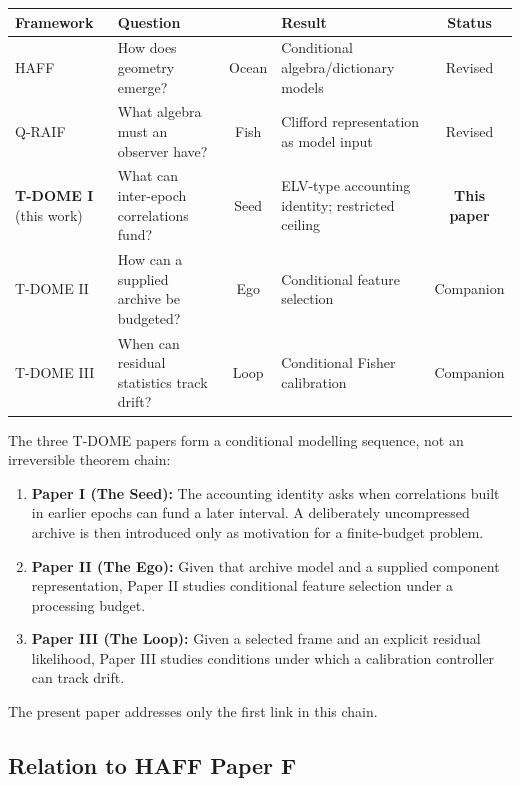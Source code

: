 \documentclass[12pt]{article}
\begin{document}
\begin{center}
\small
\setlength{\tabcolsep}{4pt}%
\begin{tabular}{@{}lP{3.2cm}cP{3.4cm}c@{}}
\toprule
\textbf{Framework} & \textbf{Question} & & \textbf{Result} & \textbf{Status} \\
\midrule
HAFF~\cite{Liu2026HAFF_A,Liu2026HAFF_B}
  & How does geometry emerge?
  & Ocean
  & Conditional algebra/dictionary models
  & Revised \\[3pt]
Q-RAIF~\cite{Liu2026QRAIF_A,Liu2026QRAIF_B}
  & What algebra must an observer have?
  & Fish
  & Clifford representation as model input
  & Revised \\[3pt]
\textbf{T-DOME I} (this work)
  & What can inter-epoch correlations fund?
  & Seed
  & ELV-type accounting identity; restricted ceiling
  & \textbf{This paper} \\[3pt]
T-DOME II
  & How can a supplied archive be budgeted?
  & Ego
  & Conditional feature selection
  & Companion \\[3pt]
T-DOME III
  & When can residual statistics track drift?
  & Loop
  & Conditional Fisher calibration
  & Companion \\
\bottomrule
\end{tabular}
\end{center}

The three T-DOME papers form a conditional modelling sequence,
not an irreversible theorem chain:
\begin{enumerate}
\item \textbf{Paper I (The Seed):} The accounting identity asks when
  correlations built in earlier epochs can fund a later interval.
  A deliberately uncompressed archive is then introduced only as
  motivation for a finite-budget problem.
\item \textbf{Paper II (The Ego):} Given that archive model and a
  supplied component representation, Paper II studies conditional
  feature selection under a processing budget.
\item \textbf{Paper III (The Loop):} Given a selected frame and an
  explicit residual likelihood, Paper III studies conditions under
  which a calibration controller can track drift.
\end{enumerate}

\noindent
The present paper addresses only the first link in this chain.

\subsection{Relation to HAFF Paper F}
\end{document}
